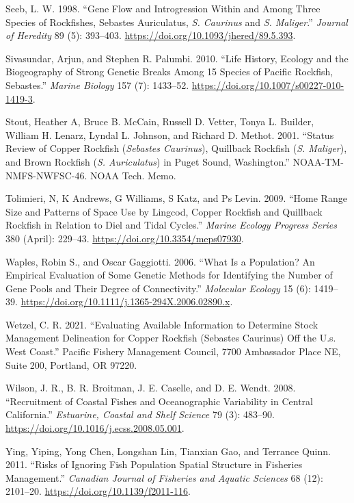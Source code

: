 \documentclass[11pt,
  english,
  letterpaper,
]{article}
\begin{document}
\leavevmode\hypertarget{ref-seeb_gene_1998}{}%
Seeb, L. W. 1998. ``Gene Flow and Introgression Within and Among Three Species of Rockfishes, Sebastes Auriculatus, \emph{S. Caurinus} and \emph{S. Maliger}.'' \emph{Journal of Heredity} 89 (5): 393--403. \url{https://doi.org/10.1093/jhered/89.5.393}.

\leavevmode\hypertarget{ref-sivasundar_life_2010}{}%
Sivasundar, Arjun, and Stephen R. Palumbi. 2010. ``Life History, Ecology and the Biogeography of Strong Genetic Breaks Among 15 Species of Pacific Rockfish, Sebastes.'' \emph{Marine Biology} 157 (7): 1433--52. \url{https://doi.org/10.1007/s00227-010-1419-3}.

\leavevmode\hypertarget{ref-Stoutetal_DPS_2001}{}%
Stout, Heather A, Bruce B. McCain, Russell D. Vetter, Tonya L. Builder, William H. Lenarz, Lyndal L. Johnson, and Richard D. Methot. 2001. ``Status Review of Copper Rockfish (\emph{Sebastes Caurinus}), Quillback Rockfish (\emph{S. Maliger}), and Brown Rockfish (\emph{S. Auriculatus}) in Puget Sound, Washington.'' NOAA-TM-NMFS-NWFSC-46. NOAA Tech. Memo.

\leavevmode\hypertarget{ref-tolimieri_home_2009}{}%
Tolimieri, N, K Andrews, G Williams, S Katz, and Ps Levin. 2009. ``Home Range Size and Patterns of Space Use by Lingcod, Copper Rockfish and Quillback Rockfish in Relation to Diel and Tidal Cycles.'' \emph{Marine Ecology Progress Series} 380 (April): 229--43. \url{https://doi.org/10.3354/meps07930}.

\leavevmode\hypertarget{ref-waples_what_2006}{}%
Waples, Robin S., and Oscar Gaggiotti. 2006. ``What Is a Population? An Empirical Evaluation of Some Genetic Methods for Identifying the Number of Gene Pools and Their Degree of Connectivity.'' \emph{Molecular Ecology} 15 (6): 1419--39. \url{https://doi.org/10.1111/j.1365-294X.2006.02890.x}.

\leavevmode\hypertarget{ref-Wetzel_copper_area_2021}{}%
Wetzel, C. R. 2021. ``Evaluating Available Information to Determine Stock Management Delineation for Copper Rockfish (Sebastes Caurinus) Off the U.s. West Coast.'' Pacific Fishery Management Council, 7700 Ambassador Place NE, Suite 200, Portland, OR 97220.

\leavevmode\hypertarget{ref-wilson_recruitment_2008}{}%
Wilson, J. R., B. R. Broitman, J. E. Caselle, and D. E. Wendt. 2008. ``Recruitment of Coastal Fishes and Oceanographic Variability in Central California.'' \emph{Estuarine, Coastal and Shelf Science} 79 (3): 483--90. \url{https://doi.org/10.1016/j.ecss.2008.05.001}.

\leavevmode\hypertarget{ref-ying_risks_2011}{}%
Ying, Yiping, Yong Chen, Longshan Lin, Tianxian Gao, and Terrance Quinn. 2011. ``Risks of Ignoring Fish Population Spatial Structure in Fisheries Management.'' \emph{Canadian Journal of Fisheries and Aquatic Sciences} 68 (12): 2101--20. \url{https://doi.org/10.1139/f2011-116}.

\leavevmode\tagmcend\tagstructend
\end{document}
